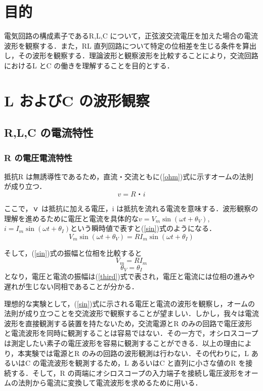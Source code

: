 \documentclass{ujarticle}
\begin{document}
\section{目的}
電気回路の構成素子であるR,L,C について，正弦波交流電圧を加えた場合の電流波形を観察する．また，RL 直列回路について特定の位相差を生じる条件を算出し，その波形を観察する．理論波形と観察波形を比較することにより，交流回路におけるL とC の働きを理解することを目的とする．

\section{L およびC の波形観察}
\subsection{R,L,C の電流特性}
\subsubsection{R の電圧電流特性}
抵抗R は無誘導性であるため，直流・交流ともに(\ref{ohm})式に示すオームの法則が成り立つ．
\begin{equation}
\label{ohm}
v = R・i
\end{equation}

ここで，ｖ は抵抗に加える電圧，i は抵抗を流れる電流を意味する．波形観察の理解を進めるために電圧と電流を具体的な$v = V_{m}\sin (\omega t + \theta _{V} )$,$i = I_{m}\sin (\omega t + \theta _{I} )$という瞬時値で表すと(\ref{sin})式のようになる．
\begin{equation}
\label{sin}
V_{m}\sin (\omega t + \theta _{V} ) = RI_{m}\sin(\omega t + \theta _{I} )
\end{equation}

そして，(\ref{sin})式の振幅と位相を比較すると
\begin{equation}
\label{third}
V_{m} = RI_{m}
\end{equation}
\begin{equation}
\label{four}
\theta _{V} = \theta _{I}
\end{equation}
となり，電圧と電流の振幅は(\ref{third})式で表され，電圧と電流には位相の進みや遅れが生じない同相であることが分かる．

理想的な実験として，(\ref{sin})式に示される電圧と電流の波形を観察し，オームの法則が成り立つことを交流波形で観察することが望ましい．しかし，我々は電流波形を直接観測する装置を持たないため，交流電源とR のみの回路で電圧波形と電流波形を同時に観測することは容易ではない．その一方で，オシロスコープは測定したい素子の電圧波形を容易に観測することができる．以上の理由により，本実験では電源とR のみの回路の波形観測は行わない．その代わりに，L あるいはC の電流波形を観測するため，L あるいはC と直列に小さな値のR を接続する．そして，R の両端にオシロスコープの入力端子を接続し電圧波形をオームの法則から電流に変換して電流波形を求めるために用いる．
\end{document}
